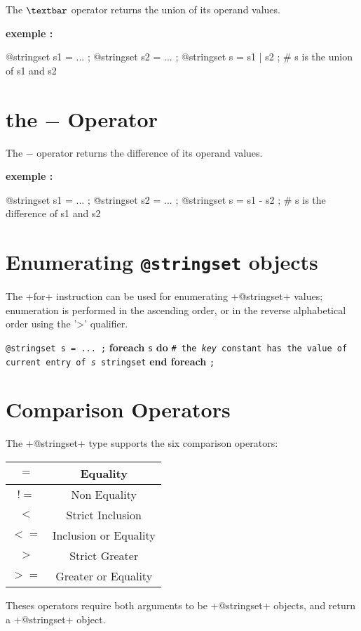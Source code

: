The \emph{$\textbar$} operator returns the union of its operand values.

\textbf{exemple :}
\begin{galgascode}
@stringset s1 = ... ;
@stringset s2 = ... ;
@stringset s = s1 | s2 ; # s is the union of s1 and s2
\end{galgascode}






\section{the \emph{$-$} Operator}

The \emph{$-$} operator returns the difference of its operand values.

\textbf{exemple :}
\begin{galgascode}
@stringset s1 = ... ;
@stringset s2 = ... ;
@stringset s = s1 - s2 ; \# s is the difference of s1 and s2
\end{galgascode}








\section{Enumerating \texttt{@stringset} objects}


The \ggs+for+ instruction can be used for enumerating \ggs+@stringset+ values; enumeration is performed in the ascending order, or in the reverse alphabetical order using the '>' qualifier.

\texttt{@stringset s = ... ;}\newline
\textbf{foreach} \texttt {s} \textbf {do}\newline
\texttt{\# the \emph{key} constant has the value of current entry of \emph{s} stringset}\newline
\textbf{end foreach} \texttt{;}







\section{Comparison Operators}

The \ggs+@stringset+ type supports the six comparison operators:\newline

\begin{tabular}{|c|c|}
\hline
$=$ & Equality \\
\hline
$!=$ & Non Equality \\
\hline
$<$  & Strict Inclusion \\
\hline
$<=$  & Inclusion or Equality \\
\hline
$>$  & Strict Greater \\
\hline
$>=$  & Greater or Equality \\
\hline
\end{tabular}

Theses operators require both arguments to be \ggs+@stringset+ objects, and return a \ggs+@stringset+ object.



